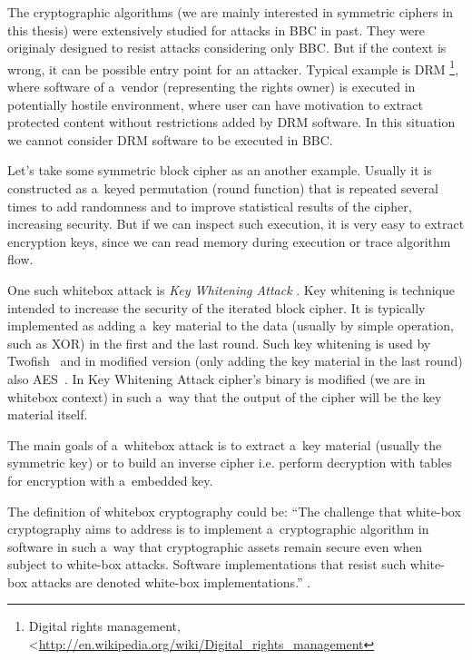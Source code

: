 \documentclass[11pt,oneside,final]{fithesis2}
\begin{document}
    The cryptographic algorithms (we are mainly interested in symmetric ciphers in this thesis) were extensively studied for attacks in BBC in past.
    They were originaly designed to resist attacks considering only BBC. But if the context is wrong, it can be possible entry point for an attacker.
    Typical example is DRM \footnote{Digital rights management, \textless\url{http://en.wikipedia.org/wiki/Digital_rights_management}}, where software of a~vendor
    (representing the rights owner) is executed in potentially hostile environment, where user can have motivation to extract protected content without
    restrictions added by DRM software. In this situation we cannot consider DRM software to be executed in BBC.
    
    Let's take some symmetric block cipher as an another example. Usually it is constructed as a~keyed permutation (round function) that is repeated 
    several times to add randomness and to improve statistical results of the cipher, increasing security. But if we can inspect such execution, it is 
    very easy to extract encryption keys, since we can read memory during execution or trace algorithm flow.
    
    One such whitebox attack is \emph{Key Whitening Attack} \cite{Kerins06acautionary}. Key whitening is technique intended to increase the security of the iterated block cipher.
    It is typically implemented as adding a~key material to the data (usually by simple operation, such as XOR) in the first and the last round. Such key whitening 
    is used by Twofish~\citep{Schneier98twofish:a} and in modified version (only adding the key material in the last round) also AES~\citep{2002-daemen}. In Key Whitening Attack
    cipher's binary is modified (we are in whitebox context) in such a~way that the output of the cipher will be the key material itself. 
    
    The main goals of a~whitebox attack is to extract a~key material (usually the symmetric key) or to build an inverse cipher i.e. perform decryption 
    with tables for encryption with a~embedded key.
    
    The definition of whitebox cryptography could be:
    ``The challenge that white-box cryptography aims to address is to implement a~cryptographic algorithm in 
    software in such a~way that cryptographic assets remain secure even when subject to white-box attacks.
    Software implementations that resist such white-box attacks are denoted white-box implementations.'' \cite{hiding_keys}.
    
\end{document}
